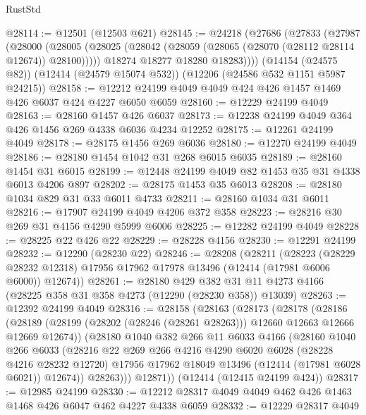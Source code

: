 \begin{lexlean}{RustStd}
\begin{coremodule}
@28114 := @12501 (@12503 @621)
@28145 := @24218
    (@27686
      (@27833
        (@27987
          (@28000
            (@28005 (@28025 (@28042 (@28059 (@28065 (@28070 (@28112 @28114 @12674)) @28100)))))
            @18274
            @18277
            @18280
            @18283))))
    (@14154 (@24575 @82))
    (@12414 (@24579 @15074 @532))
    (@12206 (@24586 @532 @1151 @5987 @24215))
@28158 := @12212 @24199 @4049 @4049 @424 @426 @1457 @1469 @426 @6037 @424 @4227 @6050 @6059
@28160 := @12229 @24199 @4049
@28163 := @28160 @1457 @426 @6037
@28173 := @12238 @24199 @4049 @364 @426 @1456 @269 @4338 @6036 @4234 @12252
@28175 := @12261 @24199 @4049
@28178 := @28175 @1456 @269 @6036
@28180 := @12270 @24199 @4049
@28186 := @28180 @1454 @1042 @31 @268 @6015 @6035
@28189 := @28160 @1454 @31 @6015
@28199 := @12448 @24199 @4049 @82 @1453 @35 @31 @4338 @6013 @4206 @897
@28202 := @28175 @1453 @35 @6013
@28208 := @28180 @1034 @829 @31 @33 @6011 @4733
@28211 := @28160 @1034 @31 @6011
@28216 := @17907 @24199 @4049 @4206 @372 @358
@28223 := @28216 @30 @269 @31 @4156 @4290 @5999 @6006
@28225 := @12282 @24199 @4049
@28228 := @28225 @22 @426 @22
@28229 := @28228 @4156
@28230 := @12291 @24199
@28232 := @12290 (@28230 @22)
@28246 := @28208
    (@28211
      (@28223
        (@28229 @28232 @12318)
        @17956
        @17962
        @17978
        @13496
        (@12414 (@17981 @6006 @6000))
        @12674))
@28261 := @28180
    @429
    @382
    @31
    @11
    @4273
    @4166
    (@28225 @358 @31 @358 @4273 (@12290 (@28230 @358)) @13039)
@28263 := @12392 @24199 @4049
@28316 := @28158
    (@28163
      (@28173
        (@28178
          (@28186
            (@28189 (@28199 (@28202 (@28246 (@28261 @28263))) @12660 @12663 @12666 @12669 @12674))
            (@28180
              @1040
              @382
              @266
              @11
              @6033
              @4166
              (@28160
                @1040
                @266
                @6033
                (@28216
                  @22
                  @269
                  @266
                  @4216
                  @4290
                  @6020
                  @6028
                  (@28228 @4216 @28232 @12720)
                  @17956
                  @17962
                  @18049
                  @13496
                  (@12414 (@17981 @6028 @6021))
                  @12674))
              @28263)))
        @12871))
    (@12414 (@12415 @24199 @424))
@28317 := @12985 @24199
@28330 := @12212 @28317 @4049 @4049 @462 @426 @1463 @1468 @426 @6047 @462 @4227 @4338 @6059
@28332 := @12229 @28317 @4049

\end{coremodule}
\end{lexlean}
